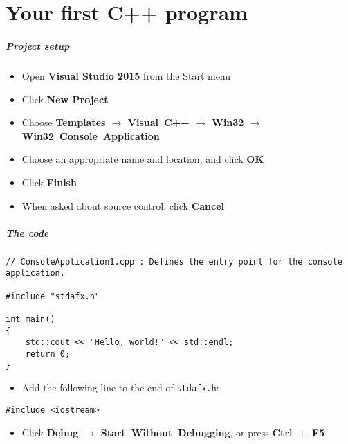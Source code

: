 \part{Your first C++ program}
\frame{\partpage}

\begin{frame}
	\frametitle{Project setup}
	\begin{itemize}
		\item Open \textbf{Visual Studio 2015} from the Start menu
		\item Click \textbf{New Project}
		\item Choose \textbf{Templates $\to$ Visual~C++ $\to$ Win32 $\to$ Win32~Console~Application}
		\item Choose an appropriate name and location, and click \textbf{OK}
		\item Click \textbf{Finish}
		\item When asked about source control, click \textbf{Cancel}
	\end{itemize}
\end{frame}

\begin{frame}[fragile]
	\frametitle{The code}
	\begin{lstlisting}
// ConsoleApplication1.cpp : Defines the entry point for the console application.

#include "stdafx.h"

int main()
{
    std::cout << "Hello, world!" << std::endl;
    return 0;
}
	\end{lstlisting}
	\begin{itemize}
		\item Add the following line to the end of \texttt{stdafx.h}:
	\end{itemize}
	\begin{lstlisting}
#include <iostream>
	\end{lstlisting}
	\begin{itemize}
		\item Click \textbf{Debug $\to$ Start~Without~Debugging}, or press \textbf{Ctrl~+~F5}
	\end{itemize}
\end{frame}

